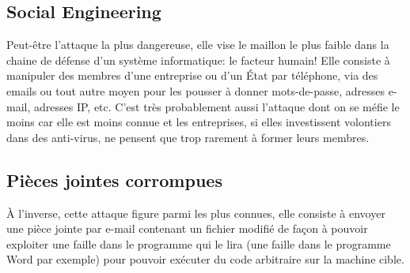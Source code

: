 \documentclass[article, french]{yReport}
\begin{document}
	\newpage
	\subsection{Social Engineering}
	Peut-être l'attaque la plus dangereuse, elle vise le maillon le plus faible dans la chaine de défense d'un système informatique: le facteur humain! Elle consiste à manipuler des membres d'une entreprise ou d'un État par téléphone, via des emails ou tout autre moyen pour les pousser à donner mots-de-passe, adresses e-mail, adresses IP, etc.
	C'est très probablement aussi l'attaque dont on se méfie le moins car elle est moins connue et les entreprises, si elles investissent volontiers dans des anti-virus, ne pensent que trop rarement à former leurs membres.
	
	\subsection{Pièces jointes corrompues}
	À l'inverse, cette attaque figure parmi les plus connues, elle consiste à envoyer une pièce jointe par e-mail contenant un fichier modifié de façon à pouvoir exploiter une faille dans le programme qui le lira (une faille dans le programme Word par exemple) pour pouvoir exécuter du code arbitraire sur la machine cible.
	
\end{document}
